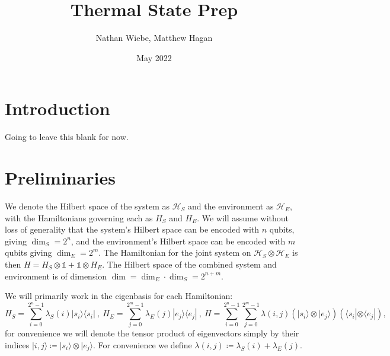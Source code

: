\documentclass{article}
\title{Thermal State Prep}
\author{Nathan Wiebe, Matthew Hagan}
\date{May 2022}
\newcommand{\ket}[1]{|#1\rangle}
\newcommand{\bra}[1]{\langle #1|}
\newcommand{\ketbra}[2]{| #1\rangle\! \langle #2|}
\newcommand{\hilb}{\mathcal{H}}
\newcommand{\identity}{\mathds{1}}
\begin{document}
\maketitle

\section{Introduction}
Going to leave this blank for now. \cite{shiraishi_undecidability_2021}

\section{Preliminaries}
We denote the Hilbert space of the system as $\hilb_{S}$ and the environment as $\hilb_{E}$, with the Hamiltonians governing each as $H_{S}$ and $H_{E}$. We will assume without loss of generality that the system's Hilbert space can be encoded with $n$ qubits, giving $\dim_S = 2^{n}$, and the environment's Hilbert space can be encoded with $m$ qubits giving $\dim_E = 2^{m}$. The Hamiltonian for the joint system on $\hilb_{S} \otimes \hilb_{E}$ is then $H = H_{S} \otimes \identity + \identity \otimes H_{E}$. The Hilbert space of the combined system and environment is of dimension $\dim = \dim_E \cdot \dim_S = 2^{n + m}$. 

We will primarily work in the eigenbasis for each Hamiltonian:
\begin{equation}
    H_{S} = \sum_{i = 0}^{2^n - 1} \lambda_S(i) \ketbra{s_i}{s_i} ~,~ H_{E} = \sum_{j=0}^{2^m - 1} \lambda_E(j) \ketbra{e_j}{e_j} ~,~ H = \sum_{i=0}^{2^n - 1} \sum_{j=0}^{2^m - 1} \lambda(i,j) (\ket{s_i} \otimes \ket{e_j})(\bra{s_i} \otimes \bra{e_j}),
\end{equation}
for convenience we will denote the tensor product of eigenvectors simply by their indices $\ket{i,j} \coloneqq \ket{s_i} \otimes \ket{e_j}$. For convenience we define $\lambda(i,j) \coloneqq \lambda_S(i) + \lambda_E(j)$.
\end{document}
